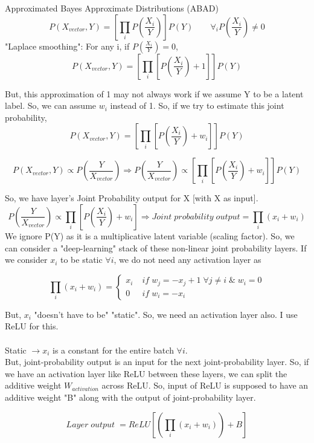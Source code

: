 \documentclass{article}
\begin{document}
	\begin{section}{Approximated Bayes Approximate Distributions (ABAD)}
		\begin{equation}
			P(X_{vector}, Y) = [\prod_i P(\frac{X_i}{Y})]P(Y) \qquad \forall_i P(\frac{X_i}{Y}) \ne 0
		\end{equation}
		"Laplace smoothing": For any i, if $P(\frac{X_i}{Y}) = 0$,
		\begin{equation}
			P(X_{vector}, Y) = [\prod_i [P(\frac{X_i}{Y}) + 1]]P(Y)
		\end{equation}

		But, this approximation of 1 may not always work if we assume Y to be a latent label. So, we can assume $w_i$ instead of 1. So, if we try to estimate this joint probability,
		\begin{equation}
			P(X_{vector}, Y) = [\prod_i [P(\frac{X_i}{Y}) + w_i]]P(Y) 
		\end{equation}
		
		\begin{equation}
			P(X_{vector}, Y) \propto P(\frac{Y}{X_{vector}}) \Rightarrow P(\frac{Y}{X_{vector}}) \propto [\prod_i [P(\frac{X_i}{Y}) + w_i]]P(Y)
		\end{equation}

		So, we have layer's Joint Probability output for X [with X as input].
		\begin{equation}
			 P(\frac{Y}{X_{vector}}) \propto \prod_i [P(\frac{X_i}{Y}) + w_i] \Rightarrow Joint \; probability \; output = \prod_i (x_i + w_i)
		\end{equation}
		We ignore P(Y) as it is a multiplicative latent variable (scaling factor). So, we can consider a "deep-learning" stack of these non-linear joint probability layers. If we consider $x_i$ to be static $\forall i$, we do not need any activation layer as 

		$$\prod_i (x_i + w_i) = \left\{
			\begin{array}{lr}
				x_i & \; if \; w_j = -x_j + 1 \;\forall j \ne i \;\&\; w_i = 0 \\
				0 & \; if \; w_i = -x_i
			\end{array}
			\right.$$ 

		But, $x_i$ "doesn't have to be" "static". So, we need an activation layer also. I use ReLU for this.\\\\
		Static $\rightarrow x_i$ is a constant for the entire batch $\forall i$.\\
		
		But, joint-probability output is an input for the next joint-probability layer. So, if we have an activation layer like ReLU between these layers, we can split the additive weight $W_{activation}$ across ReLU. So, input of ReLU is supposed to have an additive weight "B" along with the output of joint-probability layer.
		
		\begin{equation}
			Layer \; output \; = ReLU[(\prod_i(x_i + w_i)) + B]
		\end{equation}

	\end{section}
\end{document}
